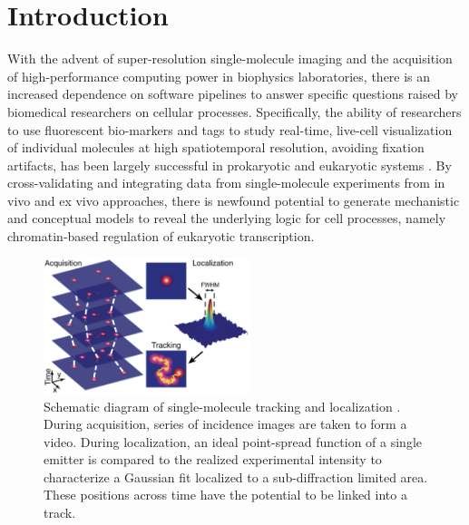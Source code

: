 \documentclass{bioinfo}
\begin{document}
\section{Introduction}


With the advent of super-resolution single-molecule imaging and the acquisition of high-performance computing power in biophysics laboratories, there is an increased dependence on software pipelines to answer specific questions raised by biomedical researchers on cellular processes. Specifically, the ability of researchers to use fluorescent bio-markers and tags to study real-time, live-cell visualization of individual molecules at high spatiotemporal resolution, avoiding fixation artifacts, has been largely successful in prokaryotic and eukaryotic systems \citep{Liu}. By cross-validating and integrating data from single-molecule experiments from in vivo and ex vivo approaches, there is newfound potential to generate mechanistic and conceptual models to reveal the underlying logic for cell processes, namely chromatin-based regulation of eukaryotic transcription.

\begin{figure}[b]
\centerline{\includegraphics[width=60mm]{local.jpg}}
\caption{Schematic diagram of single-molecule tracking and localization \citep{Manzo}. During acquisition, series of incidence images are taken to form a video. During localization, an ideal point-spread function of a single emitter is compared to the realized experimental intensity to characterize a Gaussian fit localized to a sub-diffraction limited area. These positions across time have the potential to be linked into a track.}\label{fig:01}
\end{figure}
\end{document}
